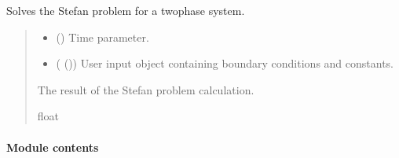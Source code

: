 \documentclass[a4paper,11pt,english,openany]{sphinxmanual}
\begin{document}
\begin{fulllineitems}
\begin{fulllineitems}
\end{fulllineitems}


\begin{fulllineitems}
\label{\detokenize{api/spyice.models.stefan_problem:src.spyice.models.stefan_problem.StefanProblem.stefan_problem_twophase}}
\pysigstartsignatures
\pysiglinewithargsret
{}
{\sphinxparamcomma {}}
{}
\pysigstopsignatures
\sphinxAtStartPar
Solves the Stefan problem for a two\sphinxhyphen{}phase system.
\begin{quote}\begin{description}
\begin{itemize}
\item {} 
\sphinxAtStartPar
{} () \textendash{} Time parameter.

\item {} 
\sphinxAtStartPar
{} ({\hyperref[\detokenize{api/spyice.parameters.user_input:src.spyice.parameters.user_input.UserInput}]{}} ()) \textendash{} User input object containing boundary conditions and constants.

\end{itemize}

\sphinxAtStartPar
The result of the Stefan problem calculation.

\sphinxAtStartPar
float

\end{description}\end{quote}

\end{fulllineitems}


\end{fulllineitems}



\paragraph{Module contents}
\label{\detokenize{api/spyice.models:module-src.spyice.models}}\label{\detokenize{api/spyice.models:module-contents}}
\sphinxstepscope
\end{document}
